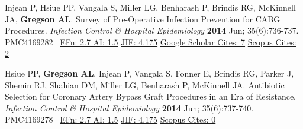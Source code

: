 \documentclass[letterpaper,10pt,sans,dvipsnames,final]{moderncv}%
\begin{document}
\begin{thebibliography}{1}
  \bibitem[24]{} Injean P, Hsiue PP, Vangala S, Miller LG, Benharash P, Brindis RG, McKinnell JA, \textbf{Gregson AL}. Survey of Pre-Operative Infection Prevention for {\smaller CABG} Procedures. {\color{BrickRed}\textit{Infection Control \& Hospital Epidemiology}} \textbf{2014} Jun; 35(6):736-737. \href{http://www.jstor.org/stable/10.1086/676435}{\aiDoi} {\smaller PMC4169282}~
    {\color{NavyBlue}\href{http://www.eigenfactor.org/rankings.php?bsearch=infection+control+and+hospital+epidemiology&searchby=journal&orderby=eigenfactor}{{\smaller EFn: 2.7 AI: 1.5}}
      \href{http://admin-apps.webofknowledge.com/JCR/JCR?RQ=RECORD&rank=1&journal=INFECT+CONT+HOSP+EP}{{\smaller JIF: 4.175}}
      \href{https://scholar.google.com/scholar?oi=bibs&hl=en&cites=9666265908143532134}{{\smaller Google Scholar Cites: 7}}
          \href{http://www.scopus.com/record/display.uri?eid=2-s2.0-84899825837&origin=resultslist&sort=plf-f&src=s&st1=&st2=&nlo=1&nlr=20&nls=&sid=4E3F003C86CD3B740CA1877B02032D8B.y7ESLndDIsN8cE7qwvy6w%3a2832&sot=anl&sdt=aut&sl=36&s=AU-ID%28%22Gregson%2c+Aric+L.%22+6603096521%29&relpos=2&citeCnt=2&searchTerm=AU-ID%28%5C%26quot%3BGregson%2C+Aric+L.%5C%26quot%3B+6603096521%29}{{\smaller Scopus Cites: 2}}
          }

  \bibitem[25]{} Hsiue PP, \textbf{Gregson AL}, Injean P, Vangala S, Fonner E, Brindis RG, Parker J, Shemin RJ, Shahian DM, Miller LG, Benharash P, McKinnell JA. Antibiotic Selection for Coronary Artery Bypass Graft Procedures in an Era of Resistance. {\color{BrickRed}\textit{Infection Control \& Hospital Epidemiology}} \textbf{2014} Jun; 35(6):737-740. \href{http://www.jstor.org/stable/10.1086/676436}{\aiDoi} {\smaller PMC4169278}~
    {\color{NavyBlue}\href{http://www.eigenfactor.org/rankings.php?bsearch=infection+control+and+hospital+epidemiology&searchby=journal&orderby=eigenfactor}{{\smaller EFn: 2.7 AI: 1.5}}
          \href{http://admin-apps.webofknowledge.com/JCR/JCR?RQ=RECORD&rank=1&journal=INFECT+CONT+HOSP+EP}{{\smaller JIF: 4.175}}
          \href{http://www.scopus.com/record/display.uri?eid=2-s2.0-84899812193&origin=resultslist&sort=plf-f&src=s&st1=&st2=&nlo=1&nlr=20&nls=&sid=4E3F003C86CD3B740CA1877B02032D8B.y7ESLndDIsN8cE7qwvy6w%3a2832&sot=anl&sdt=aut&sl=36&s=AU-ID%28%22Gregson%2c+Aric+L.%22+6603096521%29&relpos=3&citeCnt=0&searchTerm=AU-ID%28%5C%26quot%3BGregson%2C+Aric+L.%5C%26quot%3B+6603096521%29}{{\smaller Scopus Cites: 0}}
          }


\end{thebibliography}
\end{document}
